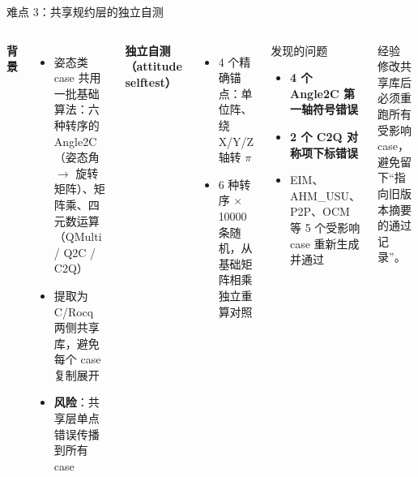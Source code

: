 \documentclass[UTF8,aspectratio=169]{ctexbeamer}
\begin{document}
\begin{frame}{难点 3：共享规约层的独立自测}
  \begin{columns}[T]
    \textbf{背景}
    \begin{itemize}\small
      \item 姿态类 case 共用一批基础算法：六种转序的 Angle2C（姿态角 $\to$ 旋转矩阵）、矩阵乘、四元数运算（QMulti / Q2C / C2Q）
      \item 提取为 C/Rocq 两侧共享库，避免每个 case 复制展开
      \item \textbf{风险}：共享层单点错误传播到所有 case
    \end{itemize}
    \textbf{独立自测（attitude selftest）}
    \begin{itemize}\small
      \item 4 个精确锚点：单位阵、绕 X/Y/Z 轴转 $\pi$
      \item 6 种转序 $\times$ 10000 条随机，从基础矩阵相乘独立重算对照
    \end{itemize}
    \begin{block}{发现的问题}
      \small
      \begin{itemize}
        \item \textbf{4 个 Angle2C 第一轴符号错误}
        \item \textbf{2 个 C2Q 对称项下标错误}
        \item EIM、AHM\_USU、P2P、OCM 等 5 个受影响 case 重新生成并通过
      \end{itemize}
    \end{block}
    \begin{block}{经验}
      \small 修改共享库后必须重跑所有受影响 case，避免留下``指向旧版本摘要的通过记录''。
    \end{block}
  \end{columns}
\end{frame}
\end{document}
